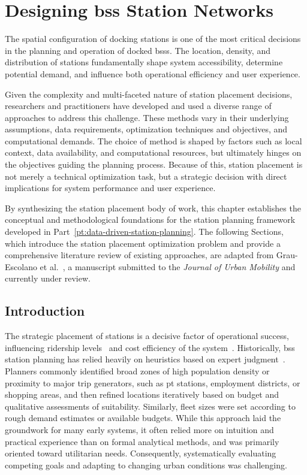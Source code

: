 \chapter[Designing BSS Station Networks]{Designing \ac{bss} Station Networks}
\label{ch:station_placement}

The spatial configuration of docking stations is one of the most critical decisions in the planning and operation of docked \acp{bss}. The location, density, and distribution of stations fundamentally shape system accessibility, determine potential demand, and influence both operational efficiency and user experience.

Given the complexity and multi-faceted nature of station placement decisions, researchers and practitioners have developed and used a diverse range of approaches to address this challenge. These methods vary in their underlying assumptions, data requirements, optimization techniques and objectives, and computational demands. The choice of method is shaped by factors such as local context, data availability, and computational resources, but ultimately hinges on the objectives guiding the planning process. Because of this, station placement is not merely a technical optimization task, but a strategic decision with direct implications for system performance and user experience.

By synthesizing the station placement body of work, this chapter establishes the conceptual and methodological foundations for the station planning framework developed in Part~\ref{pt:data-driven-station-planning}. The following Sections, which introduce the station placement optimization problem and provide a comprehensive literature review of existing approaches, are adapted from Grau-Escolano et al.~\cite{GrauEscolano2025}, a manuscript submitted to the \textit{Journal of Urban Mobility} and currently under review.

\section{Introduction}

The strategic placement of stations is a decisive factor of operational success, influencing ridership levels~\cite{NACTO2016, Kabra2018} and cost efficiency of the system~\cite{Fu2022}. Historically, \ac{bss} station planning has relied heavily on heuristics based on expert judgment~\cite{Ferrando2007, Yanocha2018, CROW2006}. Planners commonly identified broad zones of high population density or proximity to major trip generators, such as \ac{pt} stations, employment districts, or shopping areas, and then refined locations iteratively based on budget and qualitative assessments of suitability. Similarly, fleet sizes were set according to rough demand estimates or available budgets. While this approach laid the groundwork for many early systems, it often relied more on intuition and practical experience than on formal analytical methods, and was primarily oriented toward utilitarian needs. Consequently, systematically evaluating competing goals and adapting to changing urban conditions was challenging.

